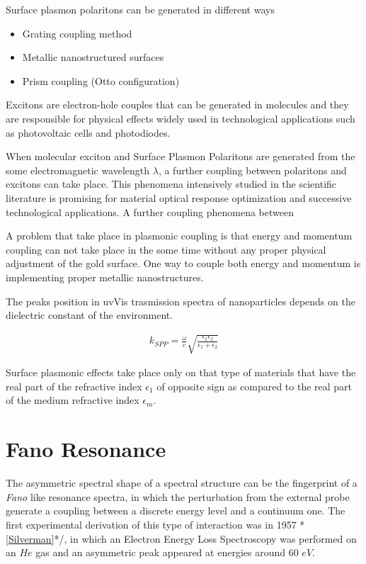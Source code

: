 Surface plasmon polaritons can be generated in different ways
\begin{itemize}
	\item Grating coupling method
	\item Metallic nanostructured surfaces
	\item Prism coupling (Otto configuration)
\end{itemize}

Excitons are electron-hole couples that can be generated in molecules and they are responsible for physical effects widely used in technological applications such as photovoltaic cells and photodiodes.

When molecular exciton and Surface Plasmon Polaritons are generated from the some electromagnetic wavelength $\lambda$, a further coupling between polaritons and excitons can take place. This phenomena intensively studied in the scientific literature is promising for material optical response optimization and successive technological applications.
A further coupling phenomena between 

A problem that take place in plasmonic coupling is that energy and momentum coupling can not take place in the some time without any proper physical adjustment of the gold surface. One way to couple both energy and momentum is implementing proper metallic nanostructures.


The peaks position in uvVis trasmission spectra of nanoparticles depends on the dielectric constant of the environment.

\begin{eqnarray}
k_{SPP} = \frac{\omega}{c} \sqrt{ \frac{ \epsilon_1 \epsilon_2}{ \epsilon_1 + \epsilon_2 } }
\end{eqnarray}


Surface plasmonic effects take place only on that type of materials that have the real part of the refractive index $\epsilon_1$ of opposite sign as compared to the real part of the medium refractive index $\epsilon_m$.


\section{Fano Resonance}


The asymmetric spectral shape of a spectral structure can be the fingerprint of a \emph{Fano} like resonance spectra, in which the perturbation from the external probe generate a coupling between a discrete energy level and a continuum one. The first experimental derivation of this type of interaction was in 1957 \/*\ref{Silverman}*/, in which an Electron Energy Loss Spectroscopy was performed on an $He$ gas and an asymmetric peak appeared at energies around $60$ $eV$.

